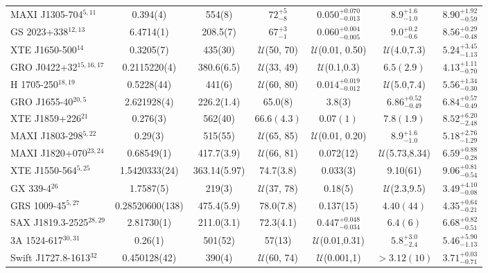 \begin{table}[h]
\begin{threeparttable}
{\begin{tabular}{|l c c c c c c|}
MAXI J1305-704$^{5,11}$ & 0.394(4) & 554(8) & $72^{+5}_{-8}$ & $0.050^{+0.070}_{-0.013}$& $8.9^{+1.6}_{-1.0}$ & $8.90_{-0.59}^{+1.92}$ \\
GS 2023+338$^{12,13}$ & 6.4714(1) & 208.5(7) & $67^{+3}_{-1}$ & $0.060^{+0.004}_{-0.005}$ & $9.0^{+0.2}_{-0.6}$ & $8.56_{-0.48}^{+0.29} $\\ 
XTE J1650-500$^{14}$ & 0.3205(7) & 435(30) & $\mathcal{U}$(50, 70) & $\mathcal{U}$(0.01, 0.50) & $\mathcal{U}$(4.0,7.3) & $5.24_{-1.13}^{+3.45}$ \\ 
GRO J0422+32$^{15,16, 17}$ & 0.2115220(4) & 380.6(6.5) & $\mathcal{U}$(33, 49) & $\mathcal{U}$(0.1,0.3)  & $6.5(2.9)$ & $4.13_{-0.70}^{+1.11}$\\ 
H 1705-250$^{18,19}$ & 0.5228(44) & 441(6) & $\mathcal{U}$(60, 80) & $0.014^{+0.019}_{-0.012}$ & $\mathcal{U}$(5.0,7.4) & $5.56_{-0.30}^{+1.34}$ \\ 
GRO J1655-40$^{20, 5}$ & 2.621928(4) & 226.2(1.4) & 65.0(8) & 3.8(3) & $6.86_{-0.49}^{+0.52}$ & $6.84_{-0.49}^{+0.57}$ \\ 
XTE J1859+226$^{21}$ & 0.276(3) & 562(40) & $66.6(4.3)$ & $0.07(1)$ & $7.8(1.9)$ & $8.52_{-2.48}^{+6.20}$\\ 
MAXI J1803-298$^{5,22}$ & 0.29(3) & 515(55) & $\mathcal{U}$(65, 85) & $\mathcal{U}$(0.01, 0.20) & $8.9^{+1.6}_{-1.0}$ & $5.18_{-1.29}^{+2.76}$\\ 
MAXI J1820+070$^{23,24}$ & 0.68549(1) & 417.7(3.9) & $\mathcal{U}$(66, 81) & 0.072(12)  & $\mathcal{U}$(5.73,8.34) & $6.59_{-0.28}^{+0.88}$\\ 
XTE J1550-564$^{5,25}$ & 1.5420333(24) & 363.14(5.97) & 74.7(3.8) & 0.033(3)  & 9.10(61) & $9.06_{-0.54}^{+0.81}$\\ 
GX 339-4$^{26}$ & 1.7587(5) & 219(3) & $\mathcal{U}$(37, 78) & 0.18(5)  & $\mathcal{U}$(2.3,9.5) & $3.49_{-0.08}^{+4.10}$\\ 
GRS 1009-45$^{5,27}$ & 0.28520600(138) & 475.4(5.9) & 78.0(7.8) & 0.137(15) & $4.40(44)$ & $4.35_{-0.21}^{+0.64}$\\ 
SAX J1819.3-2525$^{28,29}$ & 2.81730(1) & 211.0(3.1) & 72.3(4.1) & $0.447^{+0.048}_{-0.034}$  &$6.4(6)$ & $6.68_{-0.51}^{+0.82}$\\
3A 1524-617$^{30,31}$ & 0.26(1) & 501(52) & 57(13) & $\mathcal{U}$(0.01,0.31) &$5.8^{+3.0}_{-2.4}$ & $5.46_{-1.13}^{+5.90}$\\ 
Swift J1727.8-1613$^{32}$ & 0.450128(42) & 390(4) & $\mathcal{U}$(60, 74) & $\mathcal{U}$(0.001,1) & $>3.12(10)$ & $3.71_{-0.71}^{+0.03}$ \\ 

\end{tabular}}
\end{threeparttable}
\end{table}
